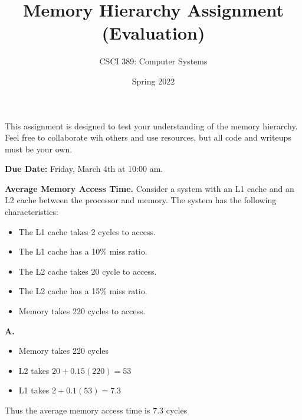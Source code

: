 \documentclass{exam}
\begin{document}
\title{Memory Hierarchy Assignment (Evaluation)}
\author{CSCI 389: Computer Systems}
\date{Spring 2022}
\maketitle

This assignment is designed to test your understanding of the memory hierarchy. 
Feel free to collaborate wih others and use resources, but all code and writeups must be your own. 

\textbf{Due Date:}
Friday, March 4th at 10:00 am. 

\begin{questions}

\question[10]
\textbf{Average Memory Access Time.}
Consider a system with an L1 cache and an L2 cache between the processor and memory. 
The system has the following characteristics:
\begin{itemize}
\item The L1 cache takes 2 cycles to access.
\item The L1 cache has a 10\% miss ratio. 
\item The L2 cache takes 20 cycle to access.
\item The L2 cache has a 15\% miss ratio. 
\item Memory takes 220 cycles to access. 
\end{itemize}

\textbf{A.}

\begin{itemize}
\item Memory takes 220 cycles
\item L2 takes $20+0.15(220)=53$
\item L1 takes $2+0.1(53)=7.3$
\end{itemize}

Thus the average memory access time is $7.3$ cycles


\end{questions}
\end{document}
